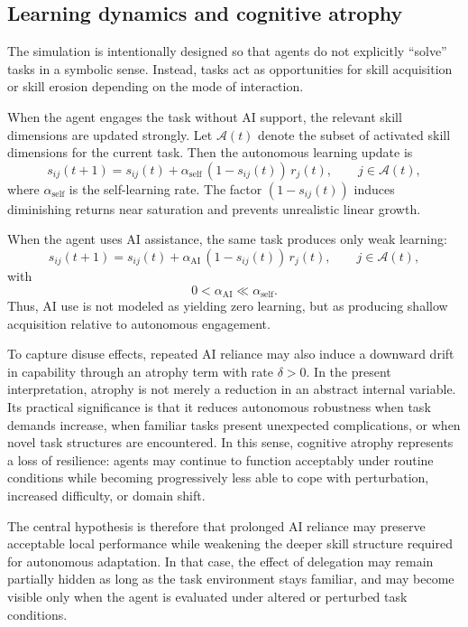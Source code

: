 \documentclass[11pt,a4paper]{article}
\begin{document}
\subsection{Learning dynamics and cognitive atrophy}

The simulation is intentionally designed so that agents do not explicitly ``solve'' tasks in a symbolic sense. Instead, tasks act as opportunities for skill acquisition or skill erosion depending on the mode of interaction.

When the agent engages the task without AI support, the relevant skill dimensions are updated strongly. Let $\mathcal{A}(t)$ denote the subset of activated skill dimensions for the current task. Then the autonomous learning update is
\[
s_{ij}(t+1) = s_{ij}(t) + \alpha_{\mathrm{self}} \, (1 - s_{ij}(t)) \, r_j(t),
\qquad j \in \mathcal{A}(t),
\]
where $\alpha_{\mathrm{self}}$ is the self-learning rate. The factor $(1 - s_{ij}(t))$ induces diminishing returns near saturation and prevents unrealistic linear growth.

When the agent uses AI assistance, the same task produces only weak learning:
\[
s_{ij}(t+1) = s_{ij}(t) + \alpha_{\mathrm{AI}} \, (1 - s_{ij}(t)) \, r_j(t),
\qquad j \in \mathcal{A}(t),
\]
with
\[
0 < \alpha_{\mathrm{AI}} \ll \alpha_{\mathrm{self}}.
\]
Thus, AI use is not modeled as yielding zero learning, but as producing shallow acquisition relative to autonomous engagement.

To capture disuse effects, repeated AI reliance may also induce a downward drift in capability through an atrophy term with rate $\delta > 0$. In the present interpretation, atrophy is not merely a reduction in an abstract internal variable. Its practical significance is that it reduces autonomous robustness when task demands increase, when familiar tasks present unexpected complications, or when novel task structures are encountered. In this sense, cognitive atrophy represents a loss of resilience: agents may continue to function acceptably under routine conditions while becoming progressively less able to cope with perturbation, increased difficulty, or domain shift.

The central hypothesis is therefore that prolonged AI reliance may preserve acceptable local performance while weakening the deeper skill structure required for autonomous adaptation. In that case, the effect of delegation may remain partially hidden as long as the task environment stays familiar, and may become visible only when the agent is evaluated under altered or perturbed task conditions.
\end{document}
